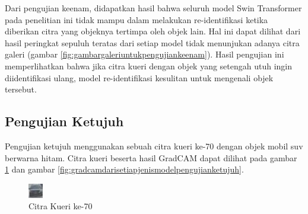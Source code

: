 Dari pengujian keenam, didapatkan hasil bahwa seluruh model Swin Transformer pada penelitian ini tidak mampu dalam melakukan 
re-identifikasi ketika diberikan citra yang objeknya tertimpa oleh objek lain. Hal ini dapat dilihat dari hasil peringkat 
sepuluh teratas dari setiap model tidak menunjukan adanya citra galeri (gambar \ref{fig:gambargaleriuntukpengujiankeenam}). 
Hasil pengujian ini memperlihatkan bahwa jika citra kueri dengan objek yang setengah utuh 
ingin diidentifikasi ulang, model re-identifikasi kesulitan untuk mengenali objek tersebut.

\subsection{Pengujian Ketujuh}

Pengujian ketujuh menggunakan sebuah citra kueri ke-70 dengan objek mobil suv \linebreak berwarna hitam. Citra kueri 
beserta hasil GradCAM dapat dilihat pada gambar \ref{fig:gambarkueriuntukpengujianketujuh} dan gambar 
\ref{fig:gradcamdarisetiapjenismodelpengujianketujuh}.

\begin{figure}[h!]
  \centering
  \includegraphics[scale=4]{gambar/Que70_114.jpg}
  \caption{Citra Kueri ke-70}
  \label{fig:gambarkueriuntukpengujianketujuh}
\end{figure}

